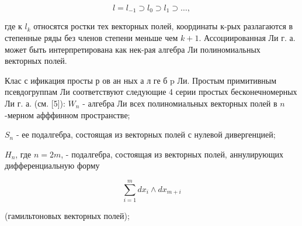 \documentclass[10pt]{article}
\begin{document}
\[

l=l_{-1} \supset l_{0} \supset l_{1} \supset \ldots,

\]



где к $l_{k}$ относятся ростки тех векторных полей, координаты к-рых разлагаются в степенные ряды без членов степени меньше чем $k+1$. Ассоциированная Ли г. а. может быть интерпретирована как нек-рая алгебра Ли полиномиальных векторных полей.



Клас с ификация просты р ов ан ных а л ге б $\mathrm{p}$ Ли. Простым примитивным псевдогруппам Ли соответствуют следующие 4 серии простых бесконечномерных Ли г. а. (см. [5]): $W_{n}$ - алгебра Ли всех полиномиальных векторных полей в $n$-мерном афффинном пространстве;



$S_{n}$ - ее подалгебра, состоящая из векторных полей с нулевой дивергенцией;



$H_{n}$, где $n=2 m$, - подалгебра, состоящая из векторных полей, аннулирующих дифференциальную форму



\[

\sum_{i=1}^{m} d x_{i} \wedge d x_{m+i}

\]



(гамильтоновых векторных полей);
\end{document}
